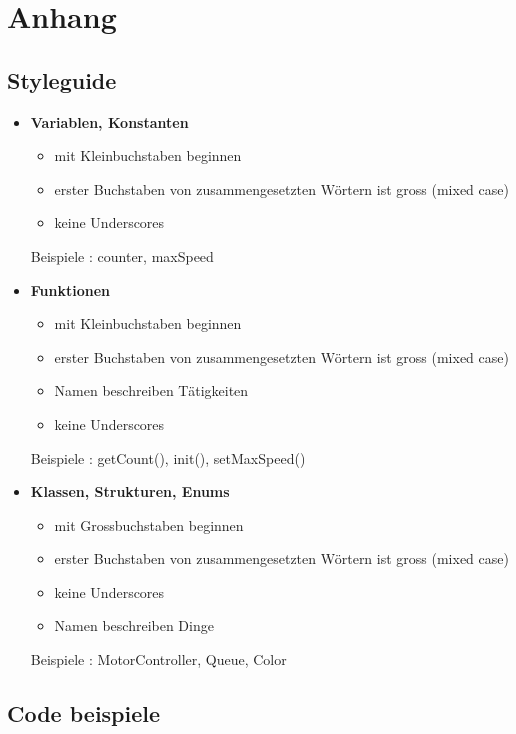\section{Anhang}

\subsection{Styleguide}

\begin{itemize}[itemsep=1pt, parsep=0pt]
    \item \textbf{Variablen, Konstanten}
    \begin{itemize}[itemsep=1pt, parsep=0pt]
        \item mit Kleinbuchstaben beginnen
        \item erster Buchstaben von zusammengesetzten Wörtern ist gross (mixed case)
        \item keine Underscores
    \end{itemize}
    Beispiele : counter, maxSpeed
    \item \textbf{Funktionen}
    \begin{itemize}[itemsep=1pt, parsep=0pt]
        \item mit Kleinbuchstaben beginnen
        \item erster Buchstaben von zusammengesetzten Wörtern ist gross (mixed case)
 
        \item Namen beschreiben Tätigkeiten
        \item keine Underscores
    \end{itemize}
    Beispiele : getCount(), init(), setMaxSpeed()
    \item \textbf{Klassen, Strukturen, Enums}
    \begin{itemize}[itemsep=1pt, parsep=0pt]
        \item mit Grossbuchstaben beginnen
        \item erster Buchstaben von zusammengesetzten Wörtern ist gross (mixed case)
        \item keine Underscores
        \item Namen beschreiben Dinge
    \end{itemize}
   
    Beispiele : MotorController, Queue, Color
\end{itemize}

\subsection{Code beispiele}
